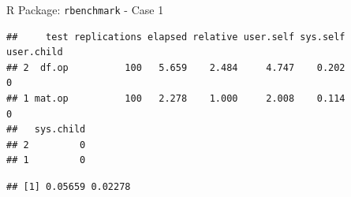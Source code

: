 \begin{frame}[fragile]{R Package: \texttt{rbenchmark} - Case 1}

\begin{Shaded}
\begin{Highlighting}[]
\NormalTok{(}\NormalTok{)}

\StringTok{ }\NormalTok{(} 
                 

\end{Highlighting}
\end{Shaded}

\begin{verbatim}
##     test replications elapsed relative user.self sys.self user.child
## 2  df.op          100   5.659    2.484     4.747    0.202          0
## 1 mat.op          100   2.278    1.000     2.008    0.114          0
##   sys.child
## 2         0
## 1         0
\end{verbatim}

\begin{Shaded}
\begin{Highlighting}[]
\NormalTok{out[,}\NormalTok{]/out[,}\NormalTok{]}
\end{Highlighting}
\end{Shaded}

\begin{verbatim}
## [1] 0.05659 0.02278
\end{verbatim}

\end{frame}

